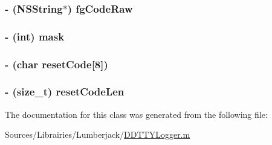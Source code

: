 \hypertarget{interface_d_d_t_t_y_logger_color_profile_ae35805abd96b32d4b54e84d6b3b41afe}{
\subsubsection[{fg\-Code\-Raw}]{\setlength{\rightskip}{0pt plus 5cm}-\/ (N\-S\-String$\ast$) fg\-Code\-Raw}}\label{interface_d_d_t_t_y_logger_color_profile_ae35805abd96b32d4b54e84d6b3b41afe}
\hypertarget{interface_d_d_t_t_y_logger_color_profile_ab070867743d6c78f573291b6e534d2ec}{
\subsubsection[{mask}]{\setlength{\rightskip}{0pt plus 5cm}-\/ (int) mask}}\label{interface_d_d_t_t_y_logger_color_profile_ab070867743d6c78f573291b6e534d2ec}
\hypertarget{interface_d_d_t_t_y_logger_color_profile_a4172364f17704b22974645c9ec8cb38c}{
\subsubsection[{reset\-Code}]{\setlength{\rightskip}{0pt plus 5cm}-\/ (char reset\-Code\mbox{[}8\mbox{]})}}\label{interface_d_d_t_t_y_logger_color_profile_a4172364f17704b22974645c9ec8cb38c}
\hypertarget{interface_d_d_t_t_y_logger_color_profile_a520426bd0ebbbdce03638fc486b5b462}{
\subsubsection[{reset\-Code\-Len}]{\setlength{\rightskip}{0pt plus 5cm}-\/ (size\-\_\-t) reset\-Code\-Len}}\label{interface_d_d_t_t_y_logger_color_profile_a520426bd0ebbbdce03638fc486b5b462}


The documentation for this class was generated from the following file\-:\begin{DoxyCompactItemize}
\item 
Sources/\-Librairies/\-Lumberjack/\hyperlink{_d_d_t_t_y_logger_8m}{D\-D\-T\-T\-Y\-Logger.\-m}\end{DoxyCompactItemize}
